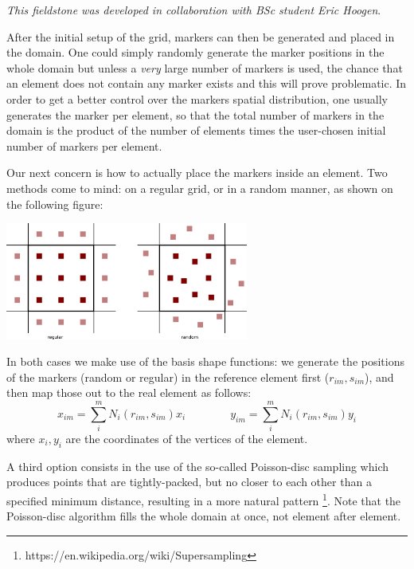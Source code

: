 

{\sl This fieldstone was developed in collaboration with BSc student Eric Hoogen}. 



After the initial setup of the grid, markers can then be generated and placed in the domain. One could simply randomly generate 
the marker positions in the whole domain but unless a {\it very} large number of markers is used, the chance that an element does 
not contain any marker exists and this will prove problematic. In order to get a better control over the markers spatial distribution, 
one usually generates the marker per element, so that the total number of markers in the domain is the product of the number of 
elements times the user-chosen initial number of markers per element. 

Our next concern is how to actually place the markers inside an element. Two methods come to mind: on a regular grid, or in a random manner, 
as shown on the following figure:

\begin{center}
\includegraphics[width=8cm]{python_codes/fieldstone_13/markers} 
\end{center}

In both cases we make use of the basis shape functions: we generate the positions of the markers (random or regular) in the reference
element first ($r_{im},s_{im}$), and then map those out to the real element as follows:
\begin{equation}
x_{im}=\sum_i^m N_i(r_{im},s_{im}) x_i
\quad\quad\quad\quad
y_{im}=\sum_i^m N_i(r_{im},s_{im}) y_i
\end{equation}
where $x_i,y_i$ are the coordinates of the vertices of the element.

A third option consists in the use of the so-called Poisson-disc sampling which 
produces points that are tightly-packed, but no closer to each other than 
a specified minimum distance, resulting in a more natural pattern 
\footnote{https://en.wikipedia.org/wiki/Supersampling}. Note that 
the Poisson-disc algorithm fills the whole domain at once, not element after element.

